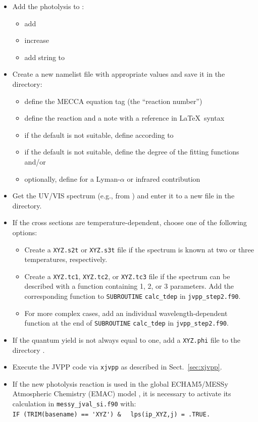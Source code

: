 \documentclass[a4paper,twoside]{article}
\newcommand{\IT}[1]{#1\index{#1}}
\def\nosep{\setlength\parsep{0mm}\setlength\topsep{0mm}\setlength\itemsep{0mm}}
\begin{document}
\begin{itemize}\nosep
\item Add the photolysis to :
  \begin{itemize}\nosep
  \item add 
  \item increase 
  \item add string to 
  \end{itemize}
\item Create a new namelist file  with appropriate values
  and save it in the  directory:
  \begin{itemize}
  \item define the MECCA equation tag  (the ``reaction
    number'')
  \item define the reaction  and a note with a reference
     in La\TeX\ syntax
  \item if the default is not suitable, define  according
    to \citet{2642}
  \item if the default is not suitable, define the degree of the fitting
    functions  and/or 
  \item optionally, define  for a Lyman-$\alpha$ or
    infrared contribution
  \end{itemize}
\item Get the UV/VIS spectrum (e.g., from \citet{2872}) and enter it to
  a new file  in the  directory.
\item If the cross sections are temperature-dependent, choose one of the
  following options:
  \begin{itemize}\nosep
  \item Create a \verb|XYZ.s2t| or \verb|XYZ.s3t| file if the spectrum
    is known at two or three temperatures, respectively.
  \item Create a \verb|XYZ.tc1|, \verb|XYZ.tc2|, or \verb|XYZ.tc3| file
    if the spectrum can be described with a function containing 1, 2, or
    3 parameters. Add the corresponding function to \verb|SUBROUTINE|
    \verb|calc_tdep| in \verb|jvpp_step2.f90|.
  \item For more complex cases, add an individual wavelength-dependent
    function at the end of \verb|SUBROUTINE| \verb|calc_tdep| in
    \verb|jvpp_step2.f90|.
  \end{itemize}
\item If the quantum yield is not always equal to one, add a
  \verb|XYZ.phi| file to the directory .
\item Execute the \IT{JVPP} code via \verb|xjvpp| as described in
  Sect.~\ref{sec:xjvpp}.
\item If the new photolysis reaction is used in the global ECHAM5/MESSy
  Atmospheric Chemistry (EMAC) model \citep{2400}, it is necessary to
  activate its calculation in \verb|messy_jval_si.f90| with:\\
  \verb|IF (TRIM(basename) == 'XYZ') &|
  \verb|  lps(ip_XYZ,j) = .TRUE.|
\end{itemize}
\end{document}
